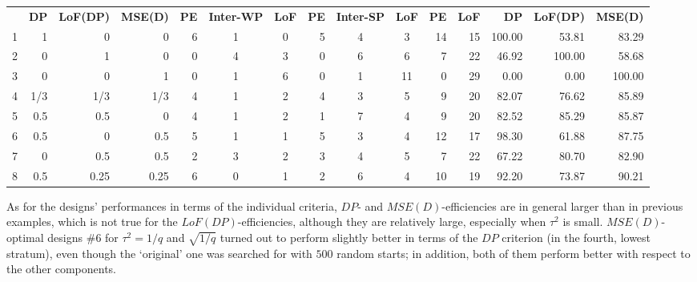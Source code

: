 \begin{table}[h]
{\begin{tabular}{rrrrccccccrrrrr}
  & \textbf{DP} & \textbf{LoF(DP)} & \textbf{MSE(D)} & \textbf{PE} & \textbf{Inter-WP} & \textbf{LoF} & \textbf{PE} & \textbf{Inter-SP} & \textbf{LoF}& \textbf{PE}      & \textbf{LoF}      & \textbf{DP} & \textbf{LoF(DP)} & \textbf{MSE(D)} \\
1 & 1    & 0    & 0    & \multicolumn{1}{|r}{6} & 1 & 0 & \multicolumn{1}{|r}{5} & 4 & 3  & \multicolumn{1}{|r}{14} & 15 & \multicolumn{1}{|r}{100.00} & 53.81  & 83.29  \\
2 & 0    & 1    & 0    & \multicolumn{1}{|r}{0} & 4 & 3 & \multicolumn{1}{|r}{0} & 6 & 6  & \multicolumn{1}{|r}{7}  & 22 & \multicolumn{1}{|r}{46.92}  & 100.00 & 58.68  \\
3 & 0    & 0    & 1    & \multicolumn{1}{|r}{0} & 1 & 6 & \multicolumn{1}{|r}{0} & 1 & 11 & \multicolumn{1}{|r}{0}  & 29 & \multicolumn{1}{|r}{0.00}  & 0.00   & 100.00 \\
4  &1/3  & 1/3  & 1/3  & \multicolumn{1}{|r}{4} & 1 & 2 & \multicolumn{1}{|r}{4} & 3 & 5  & \multicolumn{1}{|r}{9}  & 20 & \multicolumn{1}{|r}{82.07}  & 76.62  & 85.89  \\
5 & 0.5  & 0.5  & 0    & \multicolumn{1}{|r}{4} & 1 & 2 & \multicolumn{1}{|r}{1} & 7 & 4  & \multicolumn{1}{|r}{9}  & 20 & \multicolumn{1}{|r}{82.52}  & 85.29  & 85.87  \\
6 & 0.5  & 0    & 0.5  & \multicolumn{1}{|r}{5} & 1 & 1 & \multicolumn{1}{|r}{5} & 3 & 4  & \multicolumn{1}{|r}{12} & 17 & \multicolumn{1}{|r}{98.30}  & 61.88  & 87.75  \\
7 & 0    & 0.5  & 0.5  & \multicolumn{1}{|r}{2} & 3 & 2 & \multicolumn{1}{|r}{3} & 4 & 5  & \multicolumn{1}{|r}{7}  & 22 & \multicolumn{1}{|r}{67.22}  & 80.70  & 82.90  \\
8 & 0.5  & 0.25 & 0.25 & \multicolumn{1}{|r}{6} & 0 & 1 & \multicolumn{1}{|r}{2} & 6 & 4  & \multicolumn{1}{|r}{10} & 19 & \multicolumn{1}{|r}{92.20}  & 73.87  & 90.21  
\end{tabular}
}
\end{table}  

As for the designs' performances in terms of the individual criteria, $DP$- and $MSE(D)$-efficiencies are in general larger than in previous examples, which is not true for the $LoF(DP)$-efficiencies, although they are relatively large, especially when $\tau^2$ is small. $MSE(D)$-optimal designs \#$6$ for $\tau^2=1/q$ and $\sqrt{1/q}$ turned out to perform slightly better in terms of the $DP$ criterion (in the fourth, lowest stratum), even though the `original' one was searched for with $500$ random starts; in addition, both of them perform better with respect to the other components. 

